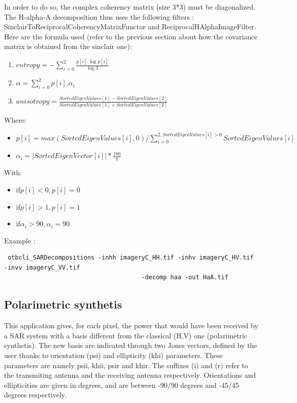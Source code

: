 In order to do so, the complex coherency matrix (size 3*3) must be diagonalized.
The H-alpha-A decomposition thus uses the following filters : SinclairToReciprocalCoherencyMatrixFunctor and ReciprocalHAlphaImageFilter.
Here are the formula used (refer to the previous section about how the covariance matrix is obtained from the sinclair one):
\begin{enumerate}
\renewcommand{\labelenumi}{Channel \arabic{enumi} : }
\item $ entropy = -\sum_{i=0}^{2} \frac{p[i].\log{p[i]}}{\log{3}} $
\item $ \alpha = \sum_{i=0}^{2} p[i].\alpha_{i} $
\item $ anisotropy = \frac {SortedEigenValues[1] - SortedEigenValues[2]}{SortedEigenValues[1] + SortedEigenValues[2]} $
\end{enumerate}

Where:
\begin{itemize}
\item $ p[i] = max(SortedEigenValues[i], 0) / \sum_{i=0}^{2, SortedEigenValues[i]>0} SortedEigenValues[i] $
\item $ \alpha_{i} = \left| SortedEigenVector[i] \right|* \frac{180}{\pi}$
\end{itemize}

With:
\begin{itemize}
\item $ \text{if} p[i] < 0, p[i]=0 $
\item $ \text{if} p[i] > 1, p[i]=1 $
\item $ \text{if} \alpha_{i} > 90, \alpha_{i}=90 $
\end{itemize}

Example :

\begin{verbatim} otbcli_SARDecompositions -inhh imageryC_HH.tif -inhv imageryC_HV.tif -invv imageryC_VV.tif
									  -decomp haa -out HaA.tif \end{verbatim}


\subsection{Polarimetric synthetis}\label{ssec:polsynth}

This application gives, for each pixel, the power that would have been received by a SAR system with a basis different from the classical (H,V) one (polarimetric synthetis). 
The new basis are indicated through two Jones vectors, defined by the user thanks to orientation (psi) and ellipticity (khi) parameters.
These parameters are namely psii, khii, psir and khir. The suffixes (i) and (r) refer to the transmiting antenna and the receiving antenna respectively.
Orientations and ellipticities are given in degrees, and are between -90/90 degrees and -45/45 degrees respectively. 

